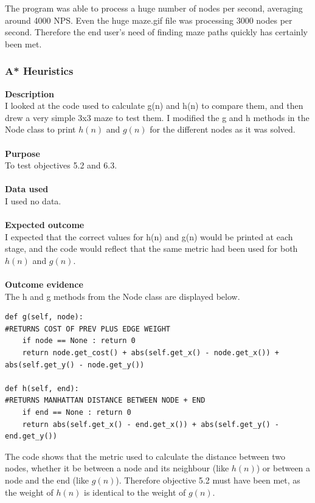 \documentclass[titlepage]{article}
\begin{document}
The program was able to process a huge number of nodes per second, averaging around 4000 NPS. Even the huge maze.gif file was processing 3000 nodes per second. Therefore the end user's need of finding maze paths quickly has certainly been met. 


\subsubsection{A* Heuristics}
\textbf{Description}\\
I looked at the code used to calculate g(n) and h(n) to compare them, and then drew a very simple 3x3 maze to test them. I modified the g and h methods in the Node class to print $h(n)$ and $g(n)$ for the different nodes as it was solved. \\\\
\textbf{Purpose}\\
To test objectives 5.2 and 6.3.\\\\
\textbf{Data used} \\
I used no data.\\\\
\textbf{Expected outcome}\\
I expected that the correct values for h(n) and g(n) would be printed at each stage, and the code would reflect that the same metric had been used for both $h(n)$ and $g(n)$. \\\\
\textbf{Outcome evidence}\\
The h and g methods from the Node class are displayed below.

\begin{changemargin}{-1in}{-1in} 
\begin{verbatim}
def g(self, node):                                                          #RETURNS COST OF PREV PLUS EDGE WEIGHT
    if node == None : return 0
    return node.get_cost() + abs(self.get_x() - node.get_x()) + abs(self.get_y() - node.get_y())
    
def h(self, end):                                                           #RETURNS MANHATTAN DISTANCE BETWEEN NODE + END
    if end == None : return 0
    return abs(self.get_x() - end.get_x()) + abs(self.get_y() - end.get_y())
\end{verbatim}
\end{changemargin} 

The code shows that the metric used to calculate the distance between two nodes, whether it be between a node and its neighbour (like $h(n)$) or between a node and the end (like $g(n)$). Therefore objective 5.2 must have been met, as the weight of $h(n)$ is identical to the weight of $g(n)$. \\\\
\end{document}
